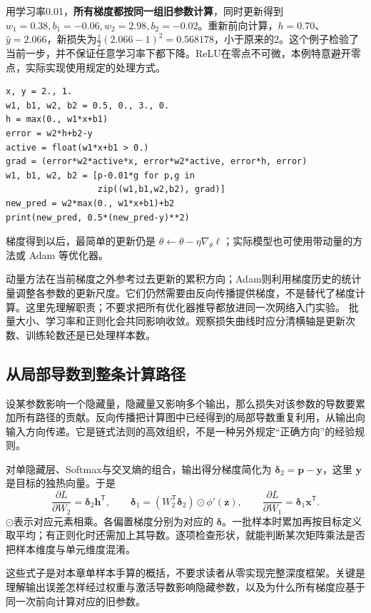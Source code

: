 用学习率0.01，\textbf{所有梯度都按同一组旧参数计算}，同时更新得到$w_1=0.38,b_1=-0.06,w_2=2.98,b_2=-0.02$。重新前向计算，$h=0.70$、$\hat y=2.066$，新损失为$\tfrac12(2.066-1)^2=0.568178$，小于原来的2。这个例子检验了当前一步，并不保证任意学习率下都下降。ReLU在零点不可微，本例特意避开零点，实际实现使用规定的处理方式。

\begin{lstlisting}[caption={核对一次网络参数更新}]
x, y = 2., 1.
w1, b1, w2, b2 = 0.5, 0., 3., 0.
h = max(0., w1*x+b1)
error = w2*h+b2-y
active = float(w1*x+b1 > 0.)
grad = (error*w2*active*x, error*w2*active, error*h, error)
w1, b1, w2, b2 = [p-0.01*g for p,g in
                  zip((w1,b1,w2,b2), grad)]
new_pred = w2*max(0., w1*x+b1)+b2
print(new_pred, 0.5*(new_pred-y)**2)
\end{lstlisting}


梯度得到以后，最简单的更新仍是 $\theta\leftarrow\theta-\eta\nabla_\theta\ell$；实际模型也可使用带动量的方法或 Adam 等优化器。

动量方法在当前梯度之外参考过去更新的累积方向；Adam则利用梯度历史的统计量调整各参数的更新尺度。它们仍然需要由反向传播提供梯度，不是替代了梯度计算。这里先理解职责；不要求把所有优化器推导都放进同一次网络入门实验。
批量大小、学习率和正则化会共同影响收敛。观察损失曲线时应分清横轴是更新次数、训练轮数还是已处理样本数。

\subsection{从局部导数到整条计算路径}
设某参数影响一个隐藏量，隐藏量又影响多个输出，那么损失对该参数的导数要累加所有路径的贡献。反向传播把计算图中已经得到的局部导数重复利用，从输出向输入方向传递。它是链式法则的高效组织，不是一种另外规定“正确方向”的经验规则。

对单隐藏层、Softmax与交叉熵的组合，输出得分梯度简化为 $\boldsymbol\delta_2=\mathbf p-\mathbf y$，这里 $\mathbf y$是目标的独热向量。于是
\[
\frac{\partial L}{\partial W_2}=\boldsymbol\delta_2\mathbf h^\mathsf T,
\qquad
\boldsymbol\delta_1=(W_2^\mathsf T\boldsymbol\delta_2)\odot\phi'(\mathbf z),
\qquad
\frac{\partial L}{\partial W_1}=\boldsymbol\delta_1\mathbf x^\mathsf T.
\]
$\odot$表示对应元素相乘。各偏置梯度分别为对应的 $\boldsymbol\delta$。一批样本时累加再按目标定义取平均；有正则化时还需加上其导数。逐项检查形状，就能判断某次矩阵乘法是否把样本维度与单元维度混淆。

这些式子是对本章单样本手算的概括，不要求读者从零实现完整深度框架。关键是理解输出误差怎样经过权重与激活导数影响隐藏参数，以及为什么所有梯度应基于同一次前向计算对应的旧参数。

